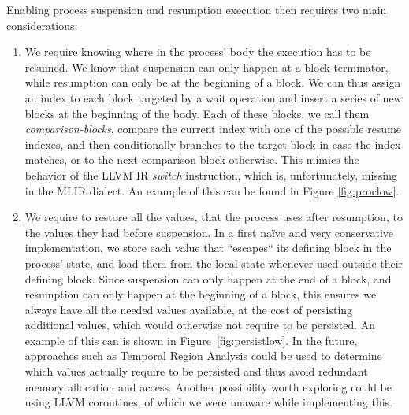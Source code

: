 Enabling process suspension and resumption execution then requires two main considerations:
\begin{enumerate}
    \item We require knowing where in the process' body the execution has to be resumed. We know that suspension can only happen at a block terminator, while resumption can only be at the beginning of a block. We can thus assign an index to each block targeted by a wait operation and insert a series of new blocks at the beginning of the body. Each of these blocks, we call them \textit{comparison-blocks}, compare the current index with one of the possible resume indexes, and then conditionally branches to the target block in case the index matches, or to the next comparison block otherwise. This mimics the behavior of the LLVM IR \textit{switch} instruction, which is, unfortunately, missing in the MLIR dialect. An example of this can be found in Figure \ref{fig:proclow}.
    \item We require to restore all the values, that the process uses after resumption, to the values they had before suspension. In a first naïve and very conservative implementation, we store each value that “escapes“ its defining block in the process' state, and load them from the local state whenever used outside their defining block. Since suspension can only happen at the end of a block, and resumption can only happen at the beginning of a block, this ensures we always have all the needed values available, at the cost of persisting additional values, which would otherwise not require to be persisted.  An example of this can is shown in Figure~\ref{fig:persistlow}.
          In the future, approaches such as Temporal Region Analysis could be used to determine which values actually require to be persisted and thus avoid redundant memory allocation and access. Another possibility worth exploring could be using LLVM coroutines, of which we were unaware while implementing this.
\end{enumerate}

